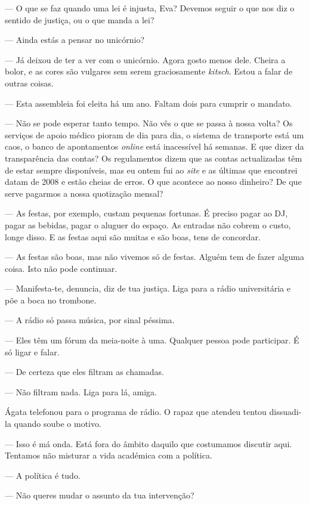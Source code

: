 --- O que se faz quando uma lei é injusta, Eva? Devemos seguir o que nos
  diz o sentido de justiça, ou o que manda a lei?

--- Ainda estás a pensar no unicórnio?

--- Já deixou de ter a ver com o unicórnio. Agora gosto menos dele. Cheira
  a bolor, e as cores são vulgares sem serem graciosamente
  \emph{kitsch}. Estou a falar de outras coisas.

--- Esta assembleia foi eleita há um ano. Faltam dois para cumprir o
  mandato.

--- Não se pode esperar tanto tempo. Não vês o que se passa à nossa volta?
  Os serviços de apoio médico pioram de dia para dia, o sistema de
  transporte está um caos, o banco de apontamentos \emph{online }está
  inacessível há semanas. E que dizer da transparência das contas? Os
  regulamentos dizem que as contas actualizadas têm de estar sempre
  disponíveis, mas eu ontem fui ao \emph{site }e as últimas que
  encontrei datam de 2008 e estão cheias de erros. O que acontece ao
  nosso dinheiro? De que serve pagarmos a nossa quotização mensal?

--- As festas, por exemplo, custam pequenas fortunas. É preciso pagar ao
  DJ, pagar as bebidas, pagar o aluguer do espaço. As entradas não
  cobrem o custo, longe disso. E as festas aqui são muitas e são boas,
  tens de concordar.

--- As festas são boas, mas não vivemos só de festas. Alguém tem de
  fazer alguma coisa. Isto não pode continuar.

--- Manifesta-te, denuncia, diz de tua justiça. Liga para a rádio
  universitária e põe a boca no trombone.

--- A rádio só passa música, por sinal péssima.

--- Eles têm um fórum da meia-noite à uma. Qualquer pessoa pode
  participar. É só ligar e falar.

--- De certeza que eles filtram as chamadas.

--- Não filtram nada. Liga para lá, amiga.

Ágata telefonou para o programa de rádio. O rapaz que atendeu tentou
dissuadi-la quando soube o motivo.

--- Isso é má onda. Está fora do âmbito daquilo que costumamos discutir
  aqui. Tentamos não misturar a vida académica com a política.

--- A política é tudo.

--- Não queres mudar o assunto da tua intervenção?

